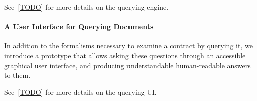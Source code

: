 See~\autoref{TODO} for more details on the querying engine.

\paragraph{A User Interface for Querying Documents} In addition to the formalisms necessary to examine a contract by querying it, we introduce a prototype that allows asking these questions through an accessible graphical user interface, and producing understandable human-readable answers to them.

See~\autoref{TODO} for more details on the querying UI\@.

